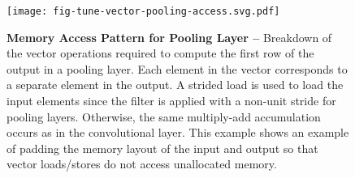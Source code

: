 
\begin{figure}[t]

  \centering
  \texttt{[image: fig-tune-vector-pooling-access.svg.pdf]}

  \caption{\textbf{Memory Access Pattern for Pooling Layer --}
    Breakdown of the vector operations required to compute the first row
    of the output in a pooling layer. Each element in the vector
    corresponds to a separate element in the output. A strided load is
    used to load the input elements since the filter is applied with a
    non-unit stride for pooling layers. Otherwise, the same multiply-add
    accumulation occurs as in the convolutional layer. This example shows
    an example of padding the memory layout of the input and output so
    that vector loads/stores do not access unallocated memory.}

  \label{fig-tuning-vectorization-pooling-access}

\end{figure}
